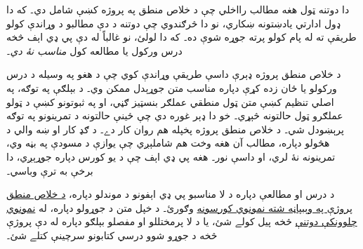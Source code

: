 \documentclass[../include/open-logic-part]{subfiles}
\begin{document}
\clearpage

\begin{editorial}
دا دوتنه ټول هغه مطالب رااخلي چې د خلاص منطق په پروژه کښې شامل دي۔ که دا ډول ادارتي يادښتونه ښکاري، نو دا څرګندوي چې دوتنه د دې مطالبو د وړاندې کولو طريقې ته له پام کولو پرته جوړه شوې ده۔ که دا لولئ، نو غالباً له دې پي ډي اېف څخه درس ورکول يا مطالعه کول \emph{مناسب نۀ دي}۔

د خلاص منطق پروژه ډېرې داسې طريقې وړاندې کوي چې د هغو په وسيله د درس ورکولو يا ځان زده کړې دپاره مناسب متن جوړېدل ممکن وي۔ د بېلګې په توګه، په اصلي تنظيم کښې متن ټول منطقي عملګر بنسټيز ګڼي، او په ثبوتونو کښې د ټولو عملګرو ټول حالتونه څېړي۔ خو دا ډېر غوره دي چې ځينې حالتونه د تمرينونو په توګه پرېښودل شي۔ د خلاص منطق پروژه پخپله هم روان کار دے۔ د ګډ کار او ښه والي د هڅولو دپاره، مطالب آن هغه وخت هم شاملېږي چې يوازې د مسودې په بڼه وي، تمرينونه نۀ لري، او داسې نور۔ هغه پي ډي اېف چې د يو کورس دپاره جوړېږي، دا برخې به ترې وباسي۔

د درس او مطالعې دپاره د لا مناسبو پي ډي اېفونو د موندلو دپاره، \href{http://builds.openlogicproject.org/}{د خلاص منطق پروژې په وېبپاڼه شته نمونوي کورسونه} وګورئ۔ د خپل متن د جوړولو دپاره، له \href{https://github.com/OpenLogicProject/OpenLogic/tree/master/courses/sample}{نمونوي چلوونکې دوتنې} څخه پيل کولے شئ، يا د لا پرمختللو او مفصلو بېلګو دپاره له دې پروژې څخه د جوړو شوو درسي کتابونو سرچينې کتلے شئ۔
\end{editorial}


















\end{document}
